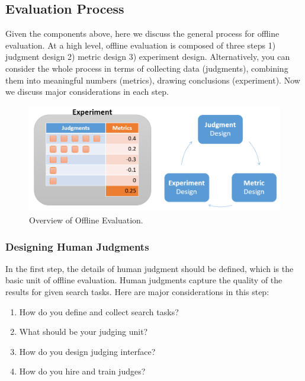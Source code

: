 \documentclass[openany]{now} %
\begin{document}
\subsection{Evaluation Process}
Given the components above, here we discuss the general process for offline evaluation. At a high level, offline evaluation is composed of three steps 1) judgment design 2) metric design 3) experiment design. Alternatively, you can consider the whole process in terms of collecting data (judgments), combining them into meaningful numbers (metrics), drawing conclusions (experiment). Now we discuss major considerations in each step.

\begin{figure}
	\begin{center}
		\includegraphics[scale=0.4]{images/offline_evaluation_overview}
		\caption{Overview of Offline Evaluation.} 
		\label{fig:offline_evaluation_overview}
	\end{center}
\end{figure}

\subsubsection{Designing Human Judgments}

In the first step, the details of human judgment should be defined, which is the basic unit of offline evaluation. Human judgments capture the quality of the results for given search tasks. Here are major considerations in this step:

\begin{enumerate}
	\item How do you define and collect search tasks?
	\item What should be your judging unit?
	\item How do you design judging interface?
	\item How do you hire and train judges?
\end{enumerate}
\end{document}
